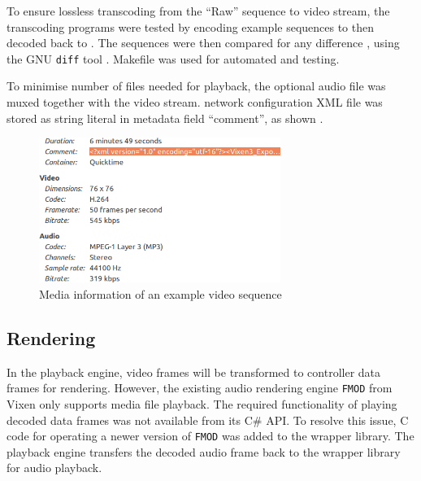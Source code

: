 To ensure lossless transcoding from the ``Raw'' sequence to  video stream, the transcoding programs were tested by encoding example sequences to  then decoded back to . The  sequences were then compared for any difference , using the GNU \texttt{diff} tool \cite{diff}. Makefile was used for automated  and testing.

To minimise number of files needed for playback, the optional audio file was muxed together with the video stream.  network configuration XML file was  stored  as  string literal in  metadata field  ``comment'', as shown  .

\begin{figure}[t]
  \centering
  \includegraphics[width=0.7\textwidth]{Figs/video_info.png}
  \caption{\footnotesize Media information of an example video sequence}
  \label{fig:video-info}
\end{figure}

\subsection{Rendering}

In the playback engine, video frames will be transformed to controller data frames for rendering. However, the existing audio rendering engine \texttt{FMOD} from Vixen only supports media file playback. The required functionality of playing decoded  data frames was not available from its C\# API. To resolve this issue, C code for operating a newer version of \texttt{FMOD} was added to the wrapper library. The playback engine transfers the decoded audio frame back to the wrapper library for audio playback.


